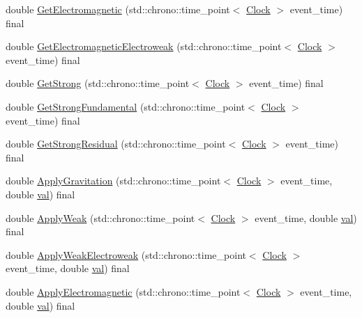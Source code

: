 \begin{DoxyCompactItemize}
\item 
double \mbox{\hyperlink{class_cognitive_network_a09e5a1c774c84529a7adfe56fadb7467}{Get\+Electromagnetic}} (std\+::chrono\+::time\+\_\+point$<$ \mbox{\hyperlink{universe_8h_a0ef8d951d1ca5ab3cfaf7ab4c7a6fd80}{Clock}} $>$ event\+\_\+time) final
\item 
double \mbox{\hyperlink{class_cognitive_network_a8c4e0454068f714691ae250f795cdb67}{Get\+Electromagnetic\+Electroweak}} (std\+::chrono\+::time\+\_\+point$<$ \mbox{\hyperlink{universe_8h_a0ef8d951d1ca5ab3cfaf7ab4c7a6fd80}{Clock}} $>$ event\+\_\+time) final
\item 
double \mbox{\hyperlink{class_cognitive_network_a277247686f8af159e7a7beb0ec379225}{Get\+Strong}} (std\+::chrono\+::time\+\_\+point$<$ \mbox{\hyperlink{universe_8h_a0ef8d951d1ca5ab3cfaf7ab4c7a6fd80}{Clock}} $>$ event\+\_\+time) final
\item 
double \mbox{\hyperlink{class_cognitive_network_a942ca90561fedae46136de620accbfea}{Get\+Strong\+Fundamental}} (std\+::chrono\+::time\+\_\+point$<$ \mbox{\hyperlink{universe_8h_a0ef8d951d1ca5ab3cfaf7ab4c7a6fd80}{Clock}} $>$ event\+\_\+time) final
\item 
double \mbox{\hyperlink{class_cognitive_network_acfa5de663b3e686c4d9ea1a3bb483b11}{Get\+Strong\+Residual}} (std\+::chrono\+::time\+\_\+point$<$ \mbox{\hyperlink{universe_8h_a0ef8d951d1ca5ab3cfaf7ab4c7a6fd80}{Clock}} $>$ event\+\_\+time) final
\item 
double \mbox{\hyperlink{class_cognitive_network_a7d3252977440a9a5c004f748647ce885}{Apply\+Gravitation}} (std\+::chrono\+::time\+\_\+point$<$ \mbox{\hyperlink{universe_8h_a0ef8d951d1ca5ab3cfaf7ab4c7a6fd80}{Clock}} $>$ event\+\_\+time, double \mbox{\hyperlink{glad_8h_a26942fd2ed566ef553eae82d2c109c8f}{val}}) final
\item 
double \mbox{\hyperlink{class_cognitive_network_a46a15b24bd61049fa1c4f635268086a1}{Apply\+Weak}} (std\+::chrono\+::time\+\_\+point$<$ \mbox{\hyperlink{universe_8h_a0ef8d951d1ca5ab3cfaf7ab4c7a6fd80}{Clock}} $>$ event\+\_\+time, double \mbox{\hyperlink{glad_8h_a26942fd2ed566ef553eae82d2c109c8f}{val}}) final
\item 
double \mbox{\hyperlink{class_cognitive_network_ab8bc213d2806f0dc49c1284bf934fc24}{Apply\+Weak\+Electroweak}} (std\+::chrono\+::time\+\_\+point$<$ \mbox{\hyperlink{universe_8h_a0ef8d951d1ca5ab3cfaf7ab4c7a6fd80}{Clock}} $>$ event\+\_\+time, double \mbox{\hyperlink{glad_8h_a26942fd2ed566ef553eae82d2c109c8f}{val}}) final
\item 
double \mbox{\hyperlink{class_cognitive_network_ae590ecb77db0a876425b9b74bcfe2bce}{Apply\+Electromagnetic}} (std\+::chrono\+::time\+\_\+point$<$ \mbox{\hyperlink{universe_8h_a0ef8d951d1ca5ab3cfaf7ab4c7a6fd80}{Clock}} $>$ event\+\_\+time, double \mbox{\hyperlink{glad_8h_a26942fd2ed566ef553eae82d2c109c8f}{val}}) final

\end{DoxyCompactItemize}

